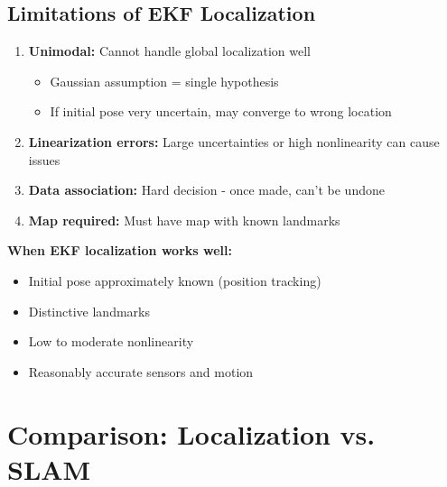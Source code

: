 \subsection{Limitations of EKF Localization}

\begin{enumerate}
    \item \textbf{Unimodal:} Cannot handle global localization well
    \begin{itemize}
        \item Gaussian assumption = single hypothesis
        \item If initial pose very uncertain, may converge to wrong location
    \end{itemize}
    
    \item \textbf{Linearization errors:} Large uncertainties or high nonlinearity can cause issues
    
    \item \textbf{Data association:} Hard decision - once made, can't be undone
    
    \item \textbf{Map required:} Must have map with known landmarks
\end{enumerate}

\textbf{When EKF localization works well:}
\begin{itemize}
    \item Initial pose approximately known (position tracking)
    \item Distinctive landmarks
    \item Low to moderate nonlinearity
    \item Reasonably accurate sensors and motion
\end{itemize}

\section{Comparison: Localization vs. SLAM}

